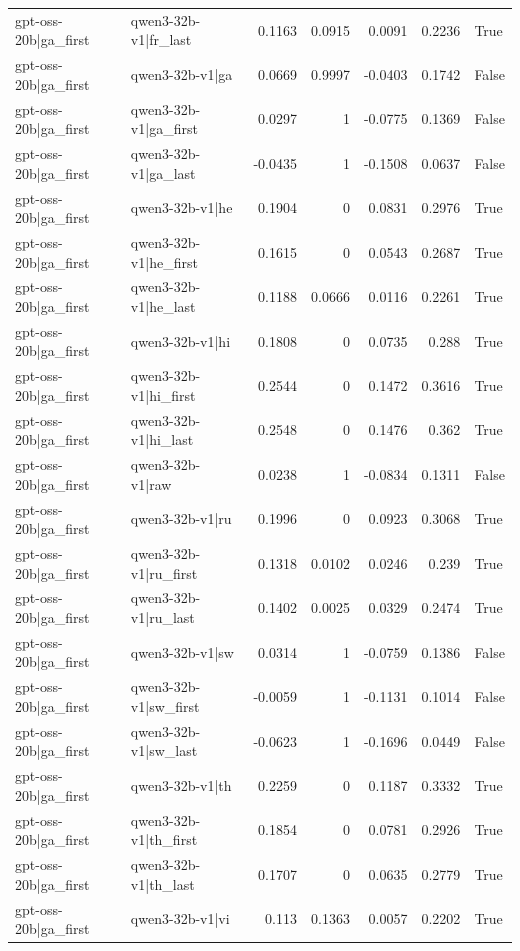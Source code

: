 \begin{table}
\begin{tabular}{l l r r r r l}
gpt-oss-20b|ga_first & qwen3-32b-v1|fr_last & 0.1163 & 0.0915 & 0.0091 & 0.2236 & True \\
gpt-oss-20b|ga_first & qwen3-32b-v1|ga & 0.0669 & 0.9997 & -0.0403 & 0.1742 & False \\
gpt-oss-20b|ga_first & qwen3-32b-v1|ga_first & 0.0297 & 1 & -0.0775 & 0.1369 & False \\
gpt-oss-20b|ga_first & qwen3-32b-v1|ga_last & -0.0435 & 1 & -0.1508 & 0.0637 & False \\
gpt-oss-20b|ga_first & qwen3-32b-v1|he & 0.1904 & 0 & 0.0831 & 0.2976 & True \\
gpt-oss-20b|ga_first & qwen3-32b-v1|he_first & 0.1615 & 0 & 0.0543 & 0.2687 & True \\
gpt-oss-20b|ga_first & qwen3-32b-v1|he_last & 0.1188 & 0.0666 & 0.0116 & 0.2261 & True \\
gpt-oss-20b|ga_first & qwen3-32b-v1|hi & 0.1808 & 0 & 0.0735 & 0.288 & True \\
gpt-oss-20b|ga_first & qwen3-32b-v1|hi_first & 0.2544 & 0 & 0.1472 & 0.3616 & True \\
gpt-oss-20b|ga_first & qwen3-32b-v1|hi_last & 0.2548 & 0 & 0.1476 & 0.362 & True \\
gpt-oss-20b|ga_first & qwen3-32b-v1|raw & 0.0238 & 1 & -0.0834 & 0.1311 & False \\
gpt-oss-20b|ga_first & qwen3-32b-v1|ru & 0.1996 & 0 & 0.0923 & 0.3068 & True \\
gpt-oss-20b|ga_first & qwen3-32b-v1|ru_first & 0.1318 & 0.0102 & 0.0246 & 0.239 & True \\
gpt-oss-20b|ga_first & qwen3-32b-v1|ru_last & 0.1402 & 0.0025 & 0.0329 & 0.2474 & True \\
gpt-oss-20b|ga_first & qwen3-32b-v1|sw & 0.0314 & 1 & -0.0759 & 0.1386 & False \\
gpt-oss-20b|ga_first & qwen3-32b-v1|sw_first & -0.0059 & 1 & -0.1131 & 0.1014 & False \\
gpt-oss-20b|ga_first & qwen3-32b-v1|sw_last & -0.0623 & 1 & -0.1696 & 0.0449 & False \\
gpt-oss-20b|ga_first & qwen3-32b-v1|th & 0.2259 & 0 & 0.1187 & 0.3332 & True \\
gpt-oss-20b|ga_first & qwen3-32b-v1|th_first & 0.1854 & 0 & 0.0781 & 0.2926 & True \\
gpt-oss-20b|ga_first & qwen3-32b-v1|th_last & 0.1707 & 0 & 0.0635 & 0.2779 & True \\
gpt-oss-20b|ga_first & qwen3-32b-v1|vi & 0.113 & 0.1363 & 0.0057 & 0.2202 & True \\

\end{tabular}
\end{table}
